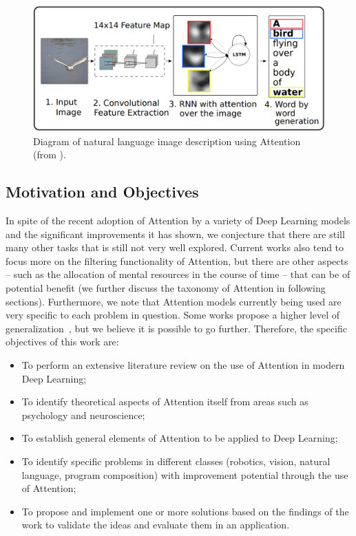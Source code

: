 \documentclass[12pt]{article}
\begin{document}
\newpage
\begin{figure}
\begin{center}
	\includegraphics[width=0.7\linewidth]{./img/img_captioning.png}
\caption{
    Diagram of natural language image description using Attention
    (from \cite{ref:img-captioning}).
}
\label{fig:description}
\end{center}
\end{figure}

\subsection{Motivation and Objectives}
In spite of the recent adoption of Attention by a variety of Deep Learning models
and the significant improvements it has shown, we conjecture that there are still many other tasks
that is still not very well explored.
Current works also tend to focus more on the filtering functionality of Attention,
but there are other aspects
-- such as the allocation of mental resources in the course of time -- that can be of potential benefit
(we further discuss the taxonomy of Attention in following sections).
Furthermore, we note that Attention models currently being used
are very specific to each problem in question.
Some works propose a higher level of generalization~\cite{ref:recurr-models},
but we believe it is possible to go further.
Therefore, the specific objectives of this work are:
\begin{itemize}
    \item To perform an extensive literature review on the use of Attention
        in modern Deep Learning;
    \item To identify theoretical aspects of Attention itself from areas such as psychology and neuroscience;
    \item To establish general elements of Attention to be applied to Deep Learning;
    \item To identify specific problems in different classes
        (robotics, vision, natural language, program composition) with
        improvement potential through the use of Attention;
    \item To propose and implement one or more solutions based on the findings of the work to
        validate the ideas and evaluate them in an application.
\end{itemize}
\end{document}
